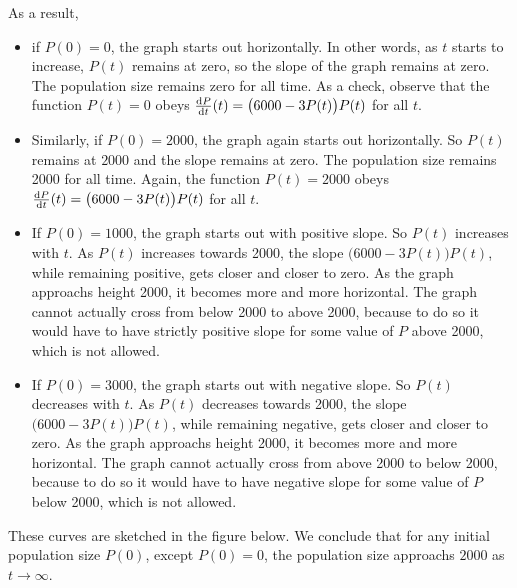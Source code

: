 As a result,
\begin{itemize}
  \item  if $P(0)=0$, the graph starts out horizontally. In other
    words, as $t$ starts to increase, $P(t)$ remains at zero, so the slope
    of the graph remains at zero. The population
    size remains zero for all time. As a check, observe that
    the function $P(t)=0$ obeys $\diff{P}{t}(t)=\big(6000-3P(t)\big)P(t)$
    for all $t$.

  \item  Similarly, if $P(0)=2000$, the graph again starts out
    horizontally. So $P(t)$ remains at $2000$ and the slope remains at zero.
    The population size remains 2000 for all time. Again, the function
    $P(t)=2000$ obeys $\diff{P}{t}(t)=\big(6000-3P(t)\big)P(t)$ for all $t$.

  \item  If $P(0)=1000$, the graph starts out with positive slope.
    So $P(t)$ increases with $t$. As $P(t)$ increases towards 2000, the slope
    $(6000-3P(t)\big)P(t)$, while remaining positive, gets closer and closer
    to zero. As the graph approachs height 2000, it becomes more and more
    horizontal. The graph cannot actually cross from below 2000 to above 2000,
    because to do so it would have to have strictly positive slope for
    some value of $P$ above 2000, which is not allowed.

  \item  If $P(0)=3000$, the graph starts out with negative slope.
    So $P(t)$ decreases with $t$. As $P(t)$ decreases towards 2000, the slope
    $(6000-3P(t)\big)P(t)$, while remaining negative, gets closer and closer
    to zero. As the graph approachs height 2000, it becomes more and more
    horizontal. The graph cannot actually cross from above 2000 to below 2000,
    because to do so it would have to have negative slope for some value of
    $P$ below 2000, which is not allowed.
\end{itemize}

\noindent These curves are sketched in the figure below. We conclude that
for any initial population size $P(0)$, except $P(0)=0$, the population
size approachs $2000$ as $t\rightarrow\infty$.

